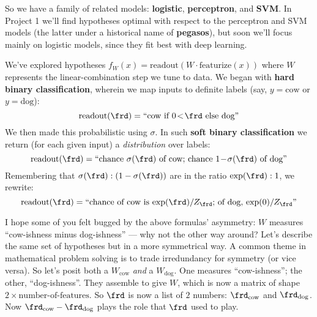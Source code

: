 
  So we have a family of related models: \textbf{logistic},
  \textbf{perceptron}, and \textbf{SVM}.  In Project 1 we'll find hypotheses
  optimal with respect to the perceptron and SVM models (the latter under a
  historical name of \textbf{pegasos}), but soon we'll focus mainly on
  logistic models, since they fit best with deep learning.





  We've explored hypotheses
  $
    f_{W}(x) = \text{readout}(W \cdot \text{featurize}(x))
  $
  where $W$ represents the linear-combination step we tune to data.
  We began with \textbf{hard binary classification}, wherein we map inputs
  to definite labels (say, $y=\text{cow}$ or $y=\text{dog}$):
  $$
    \text{readout}(\frd) = \text{``$\text{cow}$ if $0\!<\!\frd$ else $\text{dog}$''}
  $$
  We then made this probabilistic using $\sigma$.  In such \textbf{soft binary
  classification} we return (for each given input) a \emph{distribution} over labels:
  $$
    \text{readout}(\frd) =
    \text{``chance $\sigma(\frd)$ of $\text{cow}$;
            chance $1\!-\!\sigma(\frd)$ of $\text{dog}$''}
  $$
  Remembering that $\sigma(\frd) : (1-\sigma(\frd))$ are in the ratio
  $\exp(\frd) : 1$, we rewrite:
  $$
    \text{readout}(\frd) =
    \text{``chance of $\text{cow}$ is $\exp(\frd)/Z_\frd$;
            of $\text{dog}$, $\exp(0)/Z_\frd$''}
  $$


  I hope some of you felt bugged by the above formulas' asymmetry: $W$ measures
  ``cow-ishness minus dog-ishness'' --- why not the other way around?  Let's
  describe the same set of hypotheses but in a more symmetrical way.  A common
  theme in mathematical problem solving is to trade irredundancy for symmetry
  (or vice versa).  So let's posit both
  a $W_{\text{cow}}$ \emph{and}
  a $W_{\text{dog}}$.  One measures ``cow-ishness''; the other,
  ``dog-ishness''.  They assemble to give $W$, which is now a matrix of shape
  $2\!\times\!\text{number-of-features}$.  So $\frd$ is now a list of $2$ numbers:
  $\frd_{\text{cow}}$ and
  $\frd_{\text{dog}}$.
  Now $\frd_{\text{cow}} - \frd_{\text{dog}}$ plays the role that $\frd$
  used to play.


